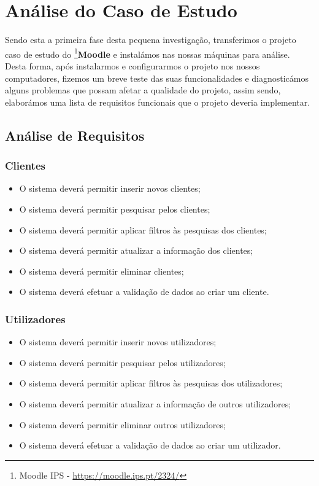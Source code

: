 \documentclass[a4paper,12pt]{article} %
\begin{document}
\newpage
\section{Análise do Caso de Estudo}
Sendo esta a primeira fase desta pequena investigação, transferimos o projeto caso de estudo do \footnote{Moodle IPS - \url{https://moodle.ips.pt/2324/}}{\textbf{Moodle}} e instalámos nas nossas máquinas para análise. Desta forma, após instalarmos e configurarmos o projeto nos nossos computadores, fizemos um breve teste das suas funcionalidades e diagnosticámos alguns problemas que possam afetar a qualidade do projeto, assim sendo, elaborámos uma lista de requisitos funcionais que o projeto deveria implementar.

\subsection{Análise de Requisitos}
\subsubsection{Clientes}
\begin{itemize}
	\item O sistema deverá permitir inserir novos clientes;
	\item O sistema deverá permitir pesquisar pelos clientes;
	\item O sistema deverá permitir aplicar filtros às pesquisas dos clientes;
	\item O sistema deverá permitir atualizar a informação dos clientes;
	\item O sistema deverá permitir eliminar clientes;
	\item O sistema deverá efetuar a validação de dados ao criar um cliente.
\end{itemize}

\subsubsection{Utilizadores}
\begin{itemize}
	\item O sistema deverá permitir inserir novos utilizadores;
	\item O sistema deverá permitir pesquisar pelos utilizadores;
	\item O sistema deverá permitir aplicar filtros às pesquisas dos utilizadores;
	\item O sistema deverá permitir atualizar a informação de outros utilizadores;
	\item O sistema deverá permitir eliminar outros utilizadores;
	\item O sistema deverá efetuar a validação de dados ao criar um utilizador.
\end{itemize}
\end{document}
